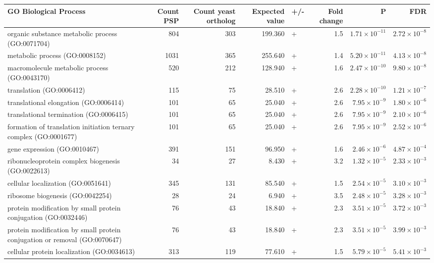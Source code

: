 \begin{sidewaystable}[ht]
\centering
\begin{adjustbox}{width=1\textwidth}
\small
\begin{tabular}{lrrrlrrr}
  \hline
GO Biological Process & Count PSP & Count yeast ortholog & Expected value & +/- & Fold change & P & FDR \\ 
  \hline
organic substance metabolic process (GO:0071704) & 804 & 303 & 199.360 & + & 1.5 & $1.71 \times 10^{-11}$ & $2.72 \times 10^{-8}$ \\ 
  metabolic process (GO:0008152) & 1031 & 365 & 255.640 & + & 1.4 & $5.20 \times 10^{-11}$ & $4.13 \times 10^{-8}$ \\ 
  macromolecule metabolic process (GO:0043170) & 520 & 212 & 128.940 & + & 1.6 & $2.47 \times 10^{-10}$ & $9.80 \times 10^{-8}$ \\ 
  translation (GO:0006412) & 115 & 75 & 28.510 & + & 2.6 & $2.28 \times 10^{-10}$ & $1.21 \times 10^{-7}$ \\ 
  translational elongation (GO:0006414) & 101 & 65 & 25.040 & + & 2.6 & $7.95 \times 10^{-9}$ & $1.80 \times 10^{-6}$ \\ 
  translational termination (GO:0006415) & 101 & 65 & 25.040 & + & 2.6 & $7.95 \times 10^{-9}$ & $2.10 \times 10^{-6}$ \\ 
  formation of translation initiation ternary complex (GO:0001677) & 101 & 65 & 25.040 & + & 2.6 & $7.95 \times 10^{-9}$ & $2.52 \times 10^{-6}$ \\ 
  gene expression (GO:0010467) & 391 & 151 & 96.950 & + & 1.6 & $2.46 \times 10^{-6}$ & $4.87 \times 10^{-4}$ \\ 
  ribonucleoprotein complex biogenesis (GO:0022613) & 34 & 27 & 8.430 & + & 3.2 & $1.32 \times 10^{-5}$ & $2.33 \times 10^{-3}$ \\ 
  cellular localization (GO:0051641) & 345 & 131 & 85.540 & + & 1.5 & $2.54 \times 10^{-5}$ & $3.10 \times 10^{-3}$ \\ 
  ribosome biogenesis (GO:0042254) & 28 & 24 & 6.940 & + & 3.5 & $2.48 \times 10^{-5}$ & $3.28 \times 10^{-3}$ \\ 
  protein modification by small protein conjugation (GO:0032446) & 76 & 43 & 18.840 & + & 2.3 & $3.51 \times 10^{-5}$ & $3.72 \times 10^{-3}$ \\ 
  protein modification by small protein conjugation or removal (GO:0070647) & 76 & 43 & 18.840 & + & 2.3 & $3.51 \times 10^{-5}$ & $3.99 \times 10^{-3}$ \\ 
  cellular protein localization (GO:0034613) & 313 & 119 & 77.610 & + & 1.5 & $5.79 \times 10^{-5}$ & $5.41 \times 10^{-3}$ \\ 

\end{tabular}
\end{adjustbox}
\end{sidewaystable}
